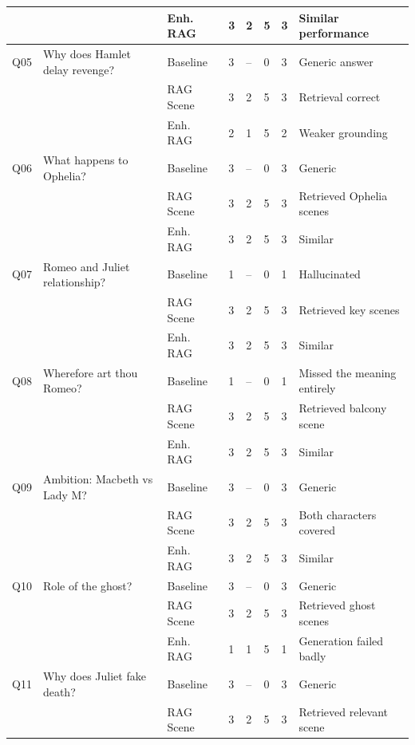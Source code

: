 \documentclass[10pt,conference]{IEEEtran}
\begin{document}
\begin{table}[p]
\begin{tabularx}{\textwidth}{p{0.6cm} p{4cm} p{2.2cm} p{0.8cm} p{0.8cm} p{0.8cm} p{0.8cm} X}
    &                               & Enh. RAG  & 3 & 2 & 5 & 3 & Similar performance \\
\midrule
Q05 & Why does Hamlet delay revenge? & Baseline & 3 & -- & 0 & 3 & Generic answer \\
    &                                & RAG Scene & 3 & 2 & 5 & 3 & Retrieval correct \\
    &                                & Enh. RAG  & 2 & 1 & 5 & 2 & Weaker grounding \\
\midrule
Q06 & What happens to Ophelia? & Baseline & 3 & -- & 0 & 3 & Generic \\
    &                          & RAG Scene & 3 & 2 & 5 & 3 & Retrieved Ophelia scenes \\
    &                          & Enh. RAG  & 3 & 2 & 5 & 3 & Similar \\
\midrule
Q07 & Romeo and Juliet relationship? & Baseline & 1 & -- & 0 & 1 & Hallucinated \\
    &                                & RAG Scene & 3 & 2 & 5 & 3 & Retrieved key scenes \\
    &                                & Enh. RAG  & 3 & 2 & 5 & 3 & Similar \\
\midrule
Q08 & Wherefore art thou Romeo? & Baseline & 1 & -- & 0 & 1 & Missed the meaning entirely \\
    &                           & RAG Scene & 3 & 2 & 5 & 3 & Retrieved balcony scene \\
    &                           & Enh. RAG  & 3 & 2 & 5 & 3 & Similar \\
\midrule
Q09 & Ambition: Macbeth vs Lady M? & Baseline & 3 & -- & 0 & 3 & Generic \\
    &                              & RAG Scene & 3 & 2 & 5 & 3 & Both characters covered \\
    &                              & Enh. RAG  & 3 & 2 & 5 & 3 & Similar \\
\midrule
Q10 & Role of the ghost? & Baseline & 3 & -- & 0 & 3 & Generic \\
    &                    & RAG Scene & 3 & 2 & 5 & 3 & Retrieved ghost scenes \\
    &                    & Enh. RAG  & 1 & 1 & 5 & 1 & Generation failed badly \\
\midrule
Q11 & Why does Juliet fake death? & Baseline & 3 & -- & 0 & 3 & Generic \\
    &                             & RAG Scene & 3 & 2 & 5 & 3 & Retrieved relevant scene \\

\end{tabularx}
\end{table}
\end{document}
